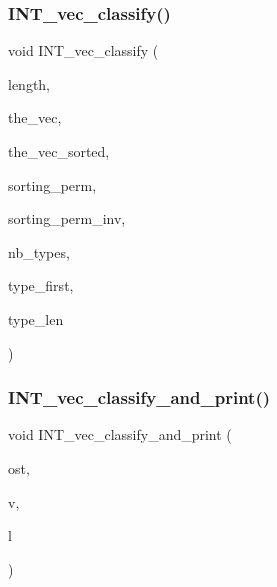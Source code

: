 \subsubsection{\texorpdfstring{I\+N\+T\+\_\+vec\+\_\+classify()}{INT\_vec\_classify()}}
{\footnotesize\ttfamily void I\+N\+T\+\_\+vec\+\_\+classify (\begin{DoxyParamCaption}\item[{\mbox{\hyperlink{galois_8h_a09fddde158a3a20bd2dcadb609de11dc}{I\+NT}}}]{length,  }\item[{\mbox{\hyperlink{galois_8h_a09fddde158a3a20bd2dcadb609de11dc}{I\+NT}} $\ast$}]{the\+\_\+vec,  }\item[{\mbox{\hyperlink{galois_8h_a09fddde158a3a20bd2dcadb609de11dc}{I\+NT}} $\ast$\&}]{the\+\_\+vec\+\_\+sorted,  }\item[{\mbox{\hyperlink{galois_8h_a09fddde158a3a20bd2dcadb609de11dc}{I\+NT}} $\ast$\&}]{sorting\+\_\+perm,  }\item[{\mbox{\hyperlink{galois_8h_a09fddde158a3a20bd2dcadb609de11dc}{I\+NT}} $\ast$\&}]{sorting\+\_\+perm\+\_\+inv,  }\item[{\mbox{\hyperlink{galois_8h_a09fddde158a3a20bd2dcadb609de11dc}{I\+NT}} \&}]{nb\+\_\+types,  }\item[{\mbox{\hyperlink{galois_8h_a09fddde158a3a20bd2dcadb609de11dc}{I\+NT}} $\ast$\&}]{type\+\_\+first,  }\item[{\mbox{\hyperlink{galois_8h_a09fddde158a3a20bd2dcadb609de11dc}{I\+NT}} $\ast$\&}]{type\+\_\+len }\end{DoxyParamCaption})}

\mbox{\label{sorting_8_c_ae039a2501ac2b4e74529dd1d83441264}} 
\subsubsection{\texorpdfstring{I\+N\+T\+\_\+vec\+\_\+classify\+\_\+and\+\_\+print()}{INT\_vec\_classify\_and\_print()}}
{\footnotesize\ttfamily void I\+N\+T\+\_\+vec\+\_\+classify\+\_\+and\+\_\+print (\begin{DoxyParamCaption}\item[{ostream \&}]{ost,  }\item[{\mbox{\hyperlink{galois_8h_a09fddde158a3a20bd2dcadb609de11dc}{I\+NT}} $\ast$}]{v,  }\item[{\mbox{\hyperlink{galois_8h_a09fddde158a3a20bd2dcadb609de11dc}{I\+NT}}}]{l }\end{DoxyParamCaption})}


